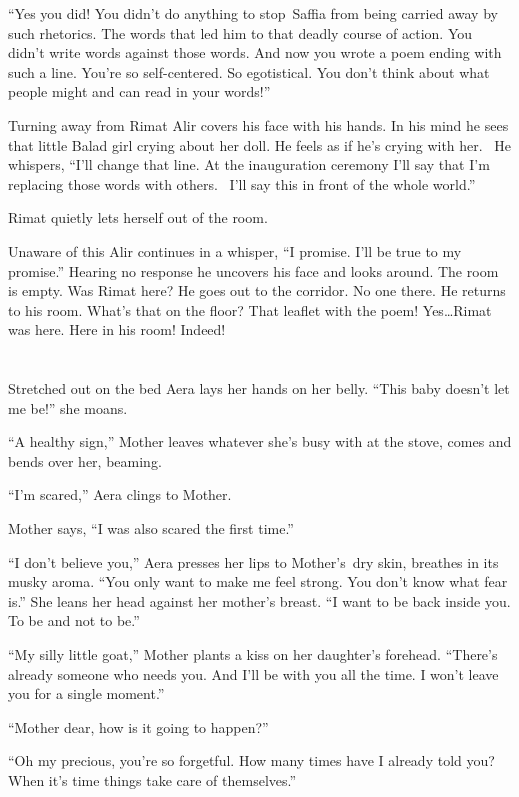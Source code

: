 \documentclass[twoside,11pt]{book}
\begin{document}
``Yes you did! You didn't do anything to stop~Saffia from being carried away by such rhetorics. The words
that led him to that deadly course of action. You didn't write words against those words. And now you wrote a poem
ending with such a line. You're so self-centered. So
egotistical.{ }You don't think about what people might and can read
in your words!''

Turning away from Rimat Alir covers his face with his hands. In his mind he sees that little Balad girl crying about her
doll. He feels as if he's crying with her. ~He whispers, ``I'll change that line. At the inauguration
ceremony I'll say that I'm replacing those words with others.~ I'll say this in front of the whole
world.''

Rimat quietly lets herself out of the room.

Unaware of this Alir continues in a whisper, ``I promise.  I'll be true to my promise.''
Hearing no response he uncovers his face and looks around. The room is empty. Was Rimat here? He goes out to the
corridor. No one there. He returns to his room. What's that on the floor? That leaflet with the poem! Yes{\ldots}Rimat
was here. Here in his room! Indeed!


\chapter{}

Stretched out on the bed Aera lays her hands on her belly. ``This baby doesn't let me be!''
she moans.

``A healthy sign,'' Mother leaves whatever she's busy with at the stove, comes and bends over
her, beaming.

``I'm scared,'' Aera clings to Mother{.}

Mother says, ``I was also scared the{ }first time.''

``I don't believe you,'' Aera presses her lips{ }to Mother's~dry skin,
breathes in its musky aroma. ``You only want to make me feel strong. You don't know what fear
is.'' She leans her head against her mother's breast. ``I want to be back inside you. To be
and not to be.''

``My silly little goat,'' Mother plants a kiss on her daughter's forehead.
``There's already someone who needs you. And I'll be with you all the time. I won't leave you for a single
moment.''

``Mother dear, how is it going to happen?''

``Oh my precious, you're so forgetful. How many times have I already told you? When it's time things take
care of themselves.''
\end{document}
